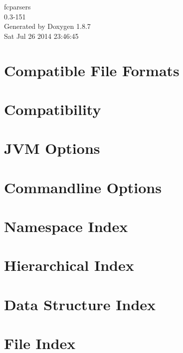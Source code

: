 \documentclass[twoside]{book}
\newcommand{\+}{\discretionary{\mbox{\scriptsize$\hookleftarrow$}}{}{}}
\newcommand{\clearemptydoublepage}{%
  \newpage{\pagestyle{empty}\cleardoublepage}%
}
\begin{document}
\begin{titlepage}
\vspace*{7cm}
\begin{center}%
{\Large fcparsers \\[1ex]\large 0.\+3-\/151 }\\
\vspace*{1cm}
{\large Generated by Doxygen 1.8.7}\\
\vspace*{0.5cm}
{\small Sat Jul 26 2014 23:46:45}\\
\end{center}
\end{titlepage}
\clearemptydoublepage
\tableofcontents
\clearemptydoublepage
{}

\chapter{Compatible File Formats}
\label{formats}

\chapter{Compatibility}
\label{Compatibility}

\chapter{J\+V\+M Options}
\label{jvmopt}

\chapter{Commandline Options}
\label{cmdopt}

\chapter{Namespace Index}

\chapter{Hierarchical Index}

\chapter{Data Structure Index}

\chapter{File Index}

\end{document}
